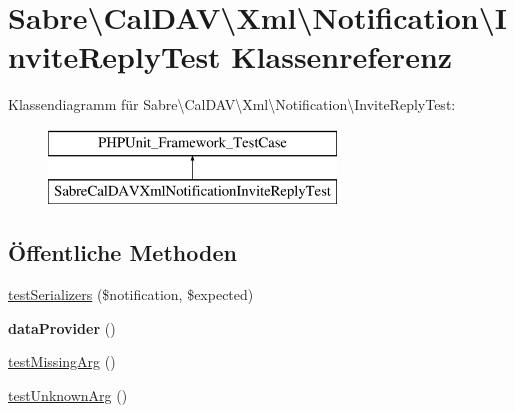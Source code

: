 \hypertarget{class_sabre_1_1_cal_d_a_v_1_1_xml_1_1_notification_1_1_invite_reply_test}{}\section{Sabre\textbackslash{}Cal\+D\+AV\textbackslash{}Xml\textbackslash{}Notification\textbackslash{}Invite\+Reply\+Test Klassenreferenz}
\label{class_sabre_1_1_cal_d_a_v_1_1_xml_1_1_notification_1_1_invite_reply_test}
Klassendiagramm für Sabre\textbackslash{}Cal\+D\+AV\textbackslash{}Xml\textbackslash{}Notification\textbackslash{}Invite\+Reply\+Test\+:\begin{figure}[H]
\begin{center}
\leavevmode
\includegraphics[height=2.000000cm]{class_sabre_1_1_cal_d_a_v_1_1_xml_1_1_notification_1_1_invite_reply_test}
\end{center}
\end{figure}
\subsection*{Öffentliche Methoden}
\begin{DoxyCompactItemize}
\item 
\mbox{\hyperlink{class_sabre_1_1_cal_d_a_v_1_1_xml_1_1_notification_1_1_invite_reply_test_a40dc64b900f11f4f319508de51e3ba4d}{test\+Serializers}} (\$notification, \$expected)
\item 
\mbox{\label{class_sabre_1_1_cal_d_a_v_1_1_xml_1_1_notification_1_1_invite_reply_test_aeff353f4885bb48158cbefac4a4a03a4}} 
{\bfseries data\+Provider} ()
\item 
\mbox{\hyperlink{class_sabre_1_1_cal_d_a_v_1_1_xml_1_1_notification_1_1_invite_reply_test_a8d71a401ef592561d6abeda49daeb87b}{test\+Missing\+Arg}} ()
\item 
\mbox{\hyperlink{class_sabre_1_1_cal_d_a_v_1_1_xml_1_1_notification_1_1_invite_reply_test_acc607944f6b7def027ae26cd07b7b41b}{test\+Unknown\+Arg}} ()
\end{DoxyCompactItemize}


